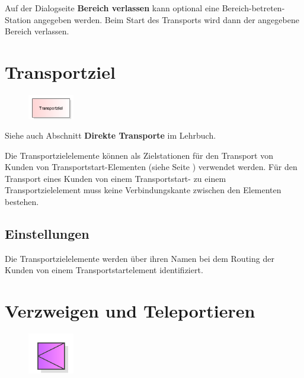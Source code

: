 Auf der Dialogseite \textbf{Bereich verlassen} kann optional eine
Bereich-betreten-Station angegeben werden. Beim Start des Transports
wird dann der angegebene Bereich verlassen.


\section{Transportziel}
\label{ref:ModelElementTransportDestination}

\begin{figure}
\vspace{-22pt}
\includegraphics[width=2cm]{imageModelElementTransportDestination.png}
\vspace{-22pt}
\end{figure}

Siehe auch Abschnitt \textbf{Direkte Transporte} im Lehrbuch.

Die Transportzielelemente können als Zielstationen für den Transport von Kunden von
Transportstart-Elementen (siehe Seite \pageref{ref:ModelElementTransportSource}) verwendet werden.
Für den Transport eines Kunden von einem Transportstart- zu einem Transportzielelement
muss keine Verbindungskante zwischen den Elementen bestehen.

\subsection*{Einstellungen}

Die Transportzielelemente werden über ihren Namen bei dem Routing der Kunden von
einem Transportstartelement identifiziert.


\section{Verzweigen und Teleportieren}
\label{ref:ModelElementDecideAndTeleport}

\begin{figure}
\vspace{-22pt}
\includegraphics[width=2cm]{imageModelElementDecideAndTeleport.png}
\vspace{-22pt}
\end{figure}

